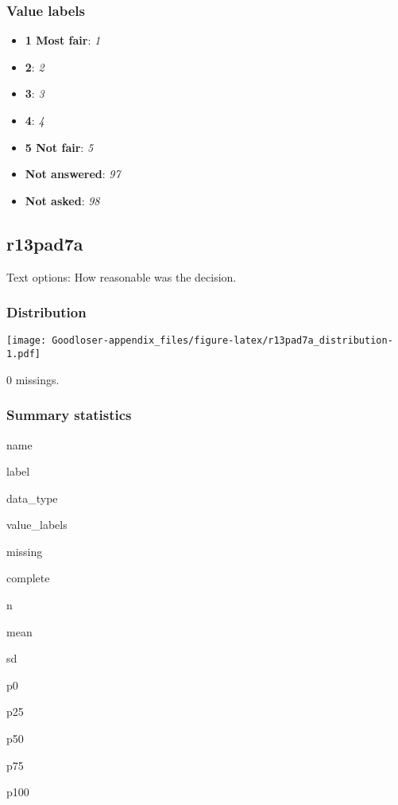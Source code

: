 \documentclass[]{book}
\providecommand{\tightlist}{%
  \setlength{\itemsep}{0pt}\setlength{\parskip}{0pt}}
\begin{document}
\subsubsection{Value labels}\label{r13pad6b_labels}

\begin{itemize}
\tightlist
\item
  \textbf{1 Most fair}: \emph{1}
\item
  \textbf{2}: \emph{2}
\item
  \textbf{3}: \emph{3}
\item
  \textbf{4}: \emph{4}
\item
  \textbf{5 Not fair}: \emph{5}
\item
  \textbf{Not answered}: \emph{97}
\item
  \textbf{Not asked}: \emph{98}
\end{itemize}

\subsection{r13pad7a}\label{r13pad7a}

Text options: How reasonable was the decision.

\subsubsection{Distribution}\label{r13pad7a_distribution}

\texttt{[image: Goodloser-appendix\_files/figure-latex/r13pad7a\_distribution-1.pdf]}

0 missings.

\subsubsection{Summary statistics}\label{r13pad7a_summary}

name

label

data\_type

value\_labels

missing

complete

n

mean

sd

p0

p25

p50

p75

p100
\end{document}
